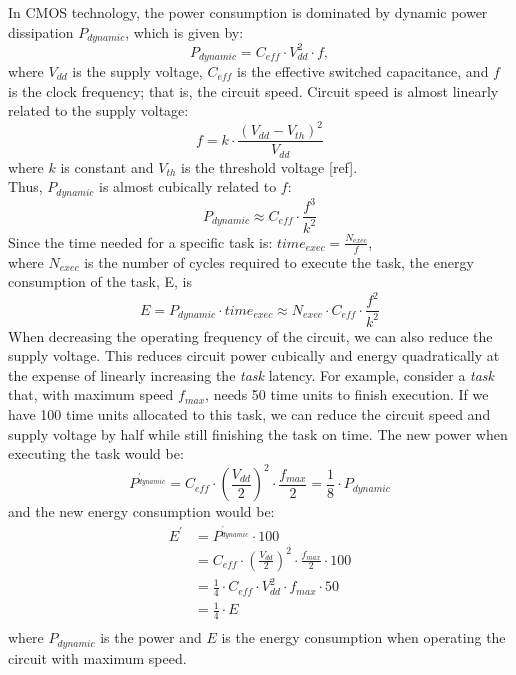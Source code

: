 \documentclass[journal]{IEEEtran}
\begin{document}
In CMOS technology, the power consumption is dominated by dynamic power dissipation $P_{dynamic}$, which is given by:
\begin{equation} \label{eq:1}
P_{dynamic} = C_{eff} \cdot V^{2}_{dd} \cdot f,
\end{equation} 
where $V_{dd}$ is the supply voltage, $C_{eff}$ is the effective switched capacitance, and $f$ is the clock frequency; that is, the circuit speed. Circuit speed is almost linearly related to the supply voltage:\\ 
\begin{equation}
f = k \cdot \frac{\left ( V_{dd} - V_{th} \right )^{2}}{V_{dd}}
\end{equation}
where $k$ is constant and $V_{th}$ is the threshold voltage [ref].\\ Thus, $P_{dynamic}$ is almost cubically related to $f$:\\ 
\begin{equation}
P_{dynamic} \approx C_{eff} \cdot \frac{f^{3}}{k^{2}}
\end{equation} 
Since the time needed for a specific task is: $time_{exec} = \frac{N_{exec}}{f}$,\\ 
where $N_{exec}$ is the number of cycles required to execute the task, the energy consumption of the task, E, is\\
\begin{equation}
 E = P_{dynamic} \cdot time_{exec} \approx N_{exec} \cdot C_{eff} \cdot \frac{f^{2}}{k^{2}}
 \end{equation} 
When decreasing the operating frequency of the circuit, we can also reduce the supply voltage. This reduces circuit power cubically and energy quadratically at the expense of linearly increasing the \emph{task} latency. For example, consider a \emph{task} that, with maximum speed $f_{max}$, needs 50 time units to finish execution. If we have 100 time units allocated to this task, we can reduce the circuit speed and supply voltage by half while still finishing the task on time. The new power when executing the task would be:\\ 
\begin{equation}
P^{_{dynamic}^{'}} = C_{eff} \cdot \left ( \frac{V_{dd}}{2} \right )^{2} \cdot \frac{f_{max}}{2} = \frac{1}{8} \cdot P_{dynamic}
\end{equation}
and the new energy consumption would be:\\ 
\begin{equation}
\begin{split}
 E^{'} & = P^{_{dynamic}^{'}} \cdot 100 \\
 & = C_{eff} \cdot \left ( \frac{V_{dd}}{2} \right )^{2} \cdot \frac{f_{max}}{2} \cdot 100 \\ 
 &  = \frac{1}{4} \cdot C_{eff} \cdot V^{2}_{dd} \cdot f_{max} \cdot 50 \\ 
 &   = \frac{1}{4} \cdot E  \\
  \end{split}
\end{equation}
where $P_{dynamic}$ is the power and $E$ is the energy consumption when operating the circuit with maximum speed. \\
\end{document}
